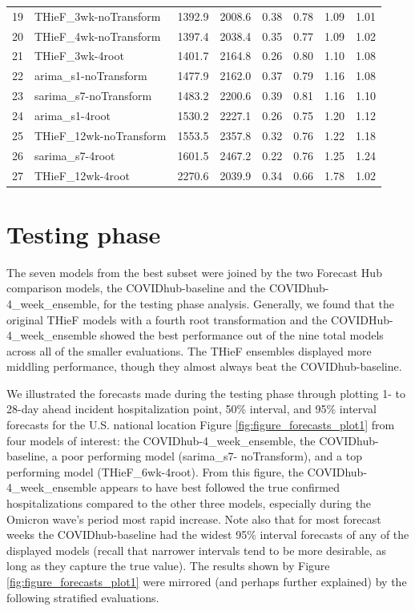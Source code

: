 \documentclass[thesis]{umassthesis}  %
\begin{document}
\begin{table}
\begin{center}
\begin{tabular}{rlrrrrrr}
  19 & THieF\_3wk-noTransform & 1392.9 & 2008.6 & 0.38 & 0.78 & 1.09 & 1.01 \\ 
  20 & THieF\_4wk-noTransform & 1397.4 & 2038.4 & 0.35 & 0.77 & 1.09 & 1.02 \\ 
  21 & THieF\_3wk-4root & 1401.7 & 2164.8 & 0.26 & 0.80 & 1.10 & 1.08 \\ 
  22 & arima\_s1-noTransform & 1477.9 & 2162.0 & 0.37 & 0.79 & 1.16 & 1.08 \\ 
  23 & sarima\_s7-noTransform & 1483.2 & 2200.6 & 0.39 & 0.81 & 1.16 & 1.10 \\ 
  24 & arima\_s1-4root & 1530.2 & 2227.1 & 0.26 & 0.75 & 1.20 & 1.12 \\ 
  25 & THieF\_12wk-noTransform & 1553.5 & 2357.8 & 0.32 & 0.76 & 1.22 & 1.18 \\ 
  26 & sarima\_s7-4root & 1601.5 & 2467.2 & 0.22 & 0.76 & 1.25 & 1.24 \\ 
  27 & THieF\_12wk-4root & 2270.6 & 2039.9 & 0.34 & 0.66 & 1.78 & 1.02 \\ 
   \hline
\end{tabular}\end{center}
\end{table}

\section{Testing phase} \label{testing_results}
The seven models from the best subset were joined by the two Forecast Hub comparison models, the COVIDhub-baseline and the COVIDhub-4\_week\_ensemble, for the testing phase analysis. Generally, we found that the original THieF models with a fourth root transformation and the COVIDHub-4\_week\_ensemble showed the best performance out of the nine total models across all of the smaller evaluations. The THieF ensembles displayed more middling performance, though they almost always beat the COVIDhub-baseline.

We illustrated the forecasts made during the testing phase through plotting 1- to 28-day ahead incident hospitalization point, 50\% interval, and 95\% interval forecasts for the U.S. national location Figure \ref{fig:figure_forecasts_plot1} from four models of interest: the COVIDhub-4\_week\_ensemble, the COVIDhub-baseline, a poor performing model (sarima\_s7- noTransform), and a top performing model (THieF\_6wk-4root). From this figure, the COVIDhub-4\_week\_ensemble appears to have best followed the true confirmed hospitalizations compared to the other three models, especially during the Omicron wave's period most rapid increase. Note also that for most forecast weeks the COVIDhub-baseline had the widest 95\% interval forecasts of any of the displayed models (recall that narrower intervals tend to be more desirable, as long as they capture the true value). The results shown by Figure \ref{fig:figure_forecasts_plot1} were mirrored (and perhaps further explained) by the following stratified evaluations.
\end{document}
